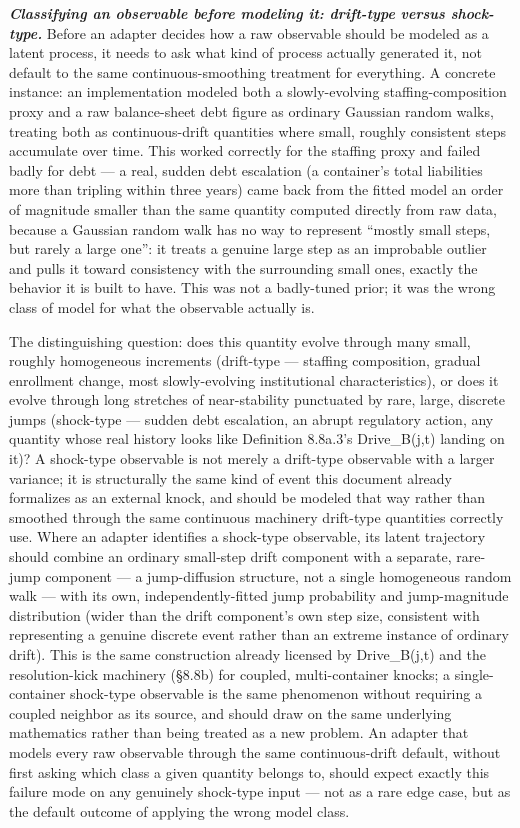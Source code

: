 \documentclass[
]{article}
\begin{document}
\emph{\textbf{Classifying an observable before modeling it: drift-type
versus shock-type.}} Before an adapter decides how a raw observable
should be modeled as a latent process, it needs to ask what kind of
process actually generated it, not default to the same
continuous-smoothing treatment for everything. A concrete instance: an
implementation modeled both a slowly-evolving staffing-composition proxy
and a raw balance-sheet debt figure as ordinary Gaussian random walks,
treating both as continuous-drift quantities where small, roughly
consistent steps accumulate over time. This worked correctly for the
staffing proxy and failed badly for debt --- a real, sudden debt
escalation (a container's total liabilities more than tripling within
three years) came back from the fitted model an order of magnitude
smaller than the same quantity computed directly from raw data, because
a Gaussian random walk has no way to represent ``mostly small steps, but
rarely a large one'': it treats a genuine large step as an improbable
outlier and pulls it toward consistency with the surrounding small ones,
exactly the behavior it is built to have. This was not a badly-tuned
prior; it was the wrong class of model for what the observable actually
is.

The distinguishing question: does this quantity evolve through many
small, roughly homogeneous increments (drift-type --- staffing
composition, gradual enrollment change, most slowly-evolving
institutional characteristics), or does it evolve through long stretches
of near-stability punctuated by rare, large, discrete jumps (shock-type
--- sudden debt escalation, an abrupt regulatory action, any quantity
whose real history looks like Definition 8.8a.3's Drive\_B(j,t) landing
on it)? A shock-type observable is not merely a drift-type observable
with a larger variance; it is structurally the same kind of event this
document already formalizes as an external knock, and should be modeled
that way rather than smoothed through the same continuous machinery
drift-type quantities correctly use. Where an adapter identifies a
shock-type observable, its latent trajectory should combine an ordinary
small-step drift component with a separate, rare-jump component --- a
jump-diffusion structure, not a single homogeneous random walk --- with
its own, independently-fitted jump probability and jump-magnitude
distribution (wider than the drift component's own step size, consistent
with representing a genuine discrete event rather than an extreme
instance of ordinary drift). This is the same construction already
licensed by Drive\_B(j,t) and the resolution-kick machinery (§8.8b) for
coupled, multi-container knocks; a single-container shock-type
observable is the same phenomenon without requiring a coupled neighbor
as its source, and should draw on the same underlying mathematics rather
than being treated as a new problem. An adapter that models every raw
observable through the same continuous-drift default, without first
asking which class a given quantity belongs to, should expect exactly
this failure mode on any genuinely shock-type input --- not as a rare
edge case, but as the default outcome of applying the wrong model class.
\end{document}
